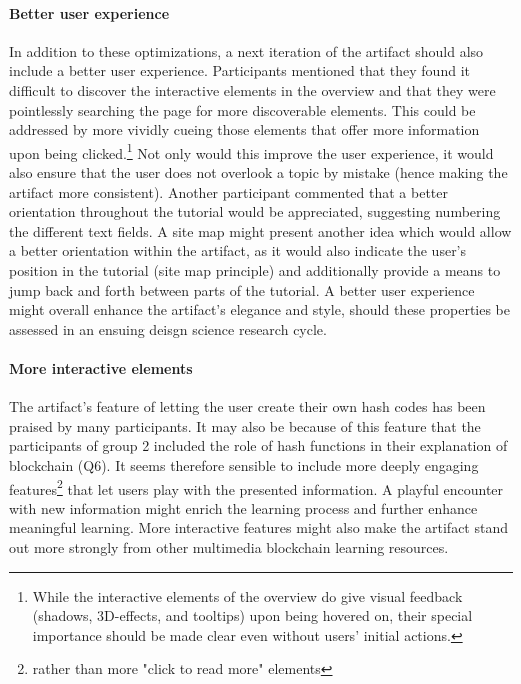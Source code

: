 \paragraph{Better user experience} In addition to these optimizations, a next iteration of the artifact should also include a better user experience. Participants mentioned that they found it difficult to discover the interactive elements in the overview and that they were pointlessly searching the page for more discoverable elements. This could be addressed by more vividly cueing those elements that offer more information upon being clicked.\footnote{While the interactive elements of the overview do give visual feedback (shadows, 3D-effects, and tooltips) upon being hovered on, their special importance should be made clear even without users' initial actions.} Not only would this improve the user experience, it would also ensure that the user does not overlook a topic by mistake (hence making the artifact more consistent). Another participant commented that a better orientation throughout the tutorial would be appreciated, suggesting numbering the different text fields. A site map might present another idea which would allow a better orientation within the artifact, as it would also indicate the user's position in the tutorial (site map principle) and additionally provide a means to jump back and forth between parts of the tutorial. A better user experience might overall enhance the artifact's elegance and style, should these properties be assessed in an ensuing deisgn science research cycle. 

\paragraph{More interactive elements} The artifact's feature of letting the user create their own hash codes has been praised by many participants. It may also be because of this feature that the participants of group 2 included the role of hash functions in their explanation of blockchain (Q6). It seems therefore sensible to include more deeply engaging features\footnote{rather than more "click to read more" elements} that let users play with the presented information. A playful encounter with new information might enrich the learning process and further enhance meaningful learning. More interactive features might also make the artifact stand out more strongly from other multimedia blockchain learning resources. 

